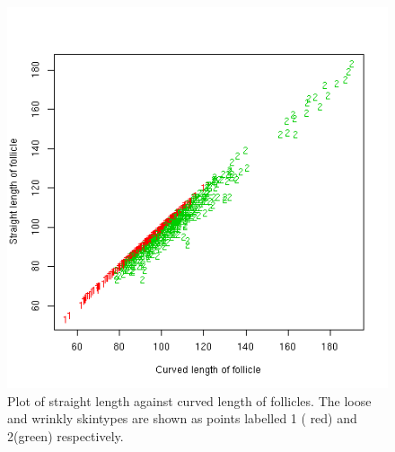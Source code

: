 %

\begin{figure}[!h]
  \centering
  \includegraphics[width=1.0\textwidth]{curvlenxt.png}
  \caption{Plot of  straight length against curved length of follicles. The loose and wrinkly skintypes are shown as points labelled 1 ( red) and 2(green) respectively.}
  \label{fig:curvlenxt}
\end{figure}

%

